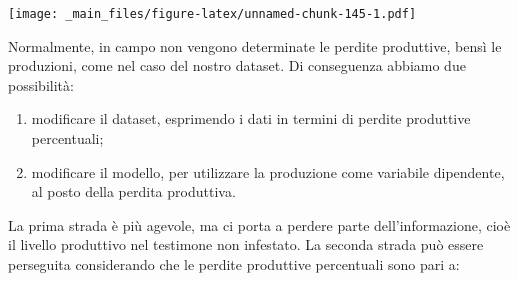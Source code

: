 \documentclass[a4paper,12pt,oneside]{book}
\providecommand{\tightlist}{%
  \setlength{\itemsep}{0pt}\setlength{\parskip}{0pt}}
\newenvironment{Shaded}{\begin{snugshade}}{\end{snugshade}}
\newcommand{\KeywordTok}[1]{\textcolor[rgb]{0.13,0.29,0.53}{\textbf{#1}}}
\newcommand{\DataTypeTok}[1]{\textcolor[rgb]{0.13,0.29,0.53}{#1}}
\newcommand{\DecValTok}[1]{\textcolor[rgb]{0.00,0.00,0.81}{#1}}
\newcommand{\StringTok}[1]{\textcolor[rgb]{0.31,0.60,0.02}{#1}}
\newcommand{\OperatorTok}[1]{\textcolor[rgb]{0.81,0.36,0.00}{\textbf{#1}}}
\newcommand{\NormalTok}[1]{#1}
\theoremstyle{definition}
\theoremstyle{definition}
\theoremstyle{definition}
\theoremstyle{remark}
\begin{document}
\begin{Shaded}
\end{Shaded}

\texttt{[image: \_main\_files/figure-latex/unnamed-chunk-145-1.pdf]}

Normalmente, in campo non vengono determinate le perdite produttive,
bensì le produzioni, come nel caso del nostro dataset. Di conseguenza
abbiamo due possibilità:

\begin{enumerate}
\def\labelenumi{\arabic{enumi}.}
\tightlist
\item
  modificare il dataset, esprimendo i dati in termini di perdite
  produttive percentuali;
\item
  modificare il modello, per utilizzare la produzione come variabile
  dipendente, al posto della perdita produttiva.
\end{enumerate}

La prima strada è più agevole, ma ci porta a perdere parte
dell'informazione, cioè il livello produttivo nel testimone non
infestato. La seconda strada può essere perseguita considerando che le
perdite produttive percentuali sono pari a:
\end{document}
